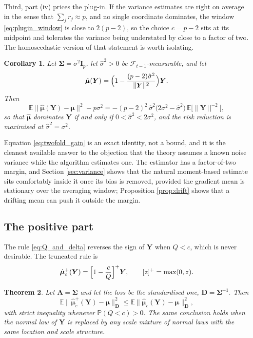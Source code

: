 \documentclass[pdflatex,sn-mathphys-num]{sn-jnl}%
\theoremstyle{thmstyleone}%
\newtheorem{theorem}{Theorem}%
\newtheorem{corollary}[theorem]{Corollary}%
\theoremstyle{thmstyletwo}%
\theoremstyle{thmstylethree}%
\newcommand{\rev}[1]{{\color{blue}#1}}
\newcommand{\E}{\mathbb{E}}
\begin{document}
Third, part (iv) prices the plug-in. If the variance estimates are right on average in the sense that $\sum_j r_j\approx p$, and no single coordinate dominates, the window \eqref{eq:plugin_window} is close to $2(p-2)$, so the choice $c=p-2$ sits at its midpoint and tolerates the variance being understated by close to a factor of two. The homoscedastic version of that statement is worth isolating.

\begin{corollary}
\label{cor:twofold}
Let $\bm\Sigma=\sigma^2\bm I_p$, let $\hat\sigma^2>0$ be $\mathcal F_{t-1}$-measurable, and let
\begin{equation}
\hat{\bm\mu}(\bm Y)=\Bigl(1-\frac{(p-2)\hat\sigma^2}{\|\bm Y\|^2}\Bigr)\bm Y .
\end{equation}
Then
\begin{equation}
\label{eq:twofold_gain}
\E\|\hat{\bm\mu}(\bm Y)-\bm\mu\|^2-p\sigma^2
=
-(p-2)^2\,\hat\sigma^2\bigl(2\sigma^2-\hat\sigma^2\bigr)\,\E\bigl[\|\bm Y\|^{-2}\bigr],
\end{equation}
so that $\hat{\bm\mu}$ dominates $\bm Y$ if and only if $0<\hat\sigma^2<2\sigma^2$, and the risk reduction is maximised at $\hat\sigma^2=\sigma^2$.
\end{corollary}

Equation \eqref{eq:twofold_gain} is an exact identity, not a bound, and it is the cleanest available answer to the objection that the theory assumes a known noise variance while the algorithm estimates one. The estimator has a factor-of-two margin, and Section \ref{sec:variance} shows that the natural moment-based estimate sits comfortably inside it once its bias is removed\rev{, provided the gradient mean is stationary over the averaging window; Proposition \ref{prop:drift} shows that a drifting mean can push it outside the margin.}

\subsection{The positive part}

The rule \eqref{eq:Q_and_delta} reverses the sign of $\bm Y$ when $Q<c$, which is never desirable. The truncated rule is
\begin{equation}
\label{eq:positive_part}
\hat{\bm\mu}^{+}_c(\bm Y)=\Bigl[1-\frac{c}{Q}\Bigr]^{+}\bm Y,
\qquad
[z]^{+}=\max(0,z).
\end{equation}

\begin{theorem}
\label{thm:positive_part}
Let $\bm A=\bm\Sigma$ and let the loss be the standardised one, $\bm D=\bm\Sigma^{-1}$. Then
\begin{equation}
\E\bigl\|\hat{\bm\mu}^{+}_c(\bm Y)-\bm\mu\bigr\|^2_{\bm D}
\le
\E\bigl\|\hat{\bm\mu}_c(\bm Y)-\bm\mu\bigr\|^2_{\bm D},
\end{equation}
with strict inequality whenever $\mathbb P(Q<c)>0$. The same conclusion holds when the normal law of $\bm Y$ is replaced by any scale mixture of normal laws with the same location and scale structure.
\end{theorem}
\end{document}
